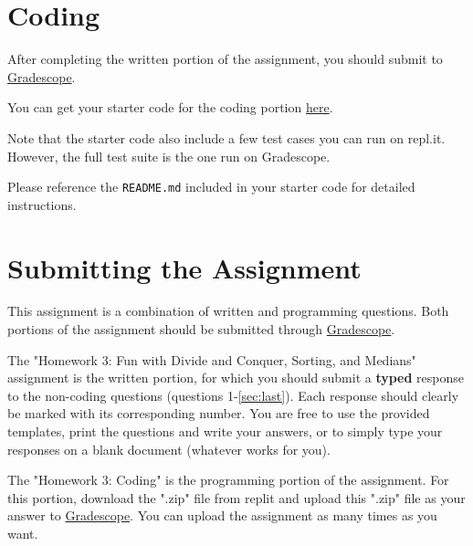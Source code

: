 \documentclass [12pt]{article}
\begin{document}
\section{Coding }
 After completing the written portion of the assignment, you should submit to \href{https://www.gradescope.com/courses/350304}{Gradescope}.

You can get your starter code for the coding portion \href{https://replit.com/team/COMP285/HW3-Code}{here}.

Note that the starter code also include a few test cases you can run on repl.it. However, the full test suite is the one run on Gradescope.

Please reference the \texttt{README.md} included in your starter code for detailed instructions.

\section*{Submitting the Assignment}

This assignment is a combination of written and programming questions. Both portions of the assignment should be submitted through \href{https://www.gradescope.com/courses/350304}{Gradescope}.

The "Homework 3: Fun with Divide and Conquer, Sorting, and Medians" assignment is the written portion, for which you should submit a \textbf{typed} response to the non-coding questions (questions 1-\ref{sec:last}). Each response should clearly be marked with its corresponding number. You are free to use the provided templates, print the questions and write your answers, or to simply type your responses on a blank document (whatever works for you).

The "Homework 3: Coding" is the programming portion of the assignment. For this portion, download the ".zip" file from replit and upload this ".zip" file as your answer to \href{https://www.gradescope.com/courses/350304}{Gradescope}. You can upload the assignment as many times as you want.
\end{document}
